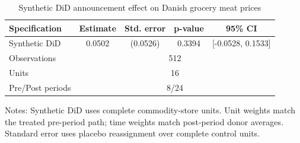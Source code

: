 \begin{table}[htbp]
\centering
\caption{Synthetic DiD announcement effect on Danish grocery meat prices}
\begin{tabular}{lcccc}
\hline
Specification & Estimate & Std. error & p-value & 95\% CI \\
\hline
Synthetic DiD & 0.0502 & (0.0526) & 0.3394 & [-0.0528, 0.1533] \\
\hline
Observations & \multicolumn{4}{c}{512} \\
Units & \multicolumn{4}{c}{16} \\
Pre/Post periods & \multicolumn{4}{c}{8/24} \\
\hline
\end{tabular}
\begin{minipage}{0.9\linewidth}\footnotesize Notes: Synthetic DiD uses complete commodity-store units. Unit weights match the treated pre-period path; time weights match post-period donor averages. Standard error uses placebo reassignment over complete control units.\end{minipage}
\end{table}